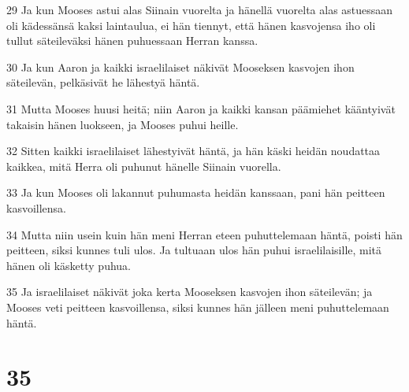 \par 29 Ja kun Mooses astui alas Siinain vuorelta ja hänellä vuorelta alas astuessaan oli kädessänsä kaksi laintaulua, ei hän tiennyt, että hänen kasvojensa iho oli tullut säteileväksi hänen puhuessaan Herran kanssa.
\par 30 Ja kun Aaron ja kaikki israelilaiset näkivät Mooseksen kasvojen ihon säteilevän, pelkäsivät he lähestyä häntä.
\par 31 Mutta Mooses huusi heitä; niin Aaron ja kaikki kansan päämiehet kääntyivät takaisin hänen luokseen, ja Mooses puhui heille.
\par 32 Sitten kaikki israelilaiset lähestyivät häntä, ja hän käski heidän noudattaa kaikkea, mitä Herra oli puhunut hänelle Siinain vuorella.
\par 33 Ja kun Mooses oli lakannut puhumasta heidän kanssaan, pani hän peitteen kasvoillensa.
\par 34 Mutta niin usein kuin hän meni Herran eteen puhuttelemaan häntä, poisti hän peitteen, siksi kunnes tuli ulos. Ja tultuaan ulos hän puhui israelilaisille, mitä hänen oli käsketty puhua.
\par 35 Ja israelilaiset näkivät joka kerta Mooseksen kasvojen ihon säteilevän; ja Mooses veti peitteen kasvoillensa, siksi kunnes hän jälleen meni puhuttelemaan häntä.

\chapter{35}


